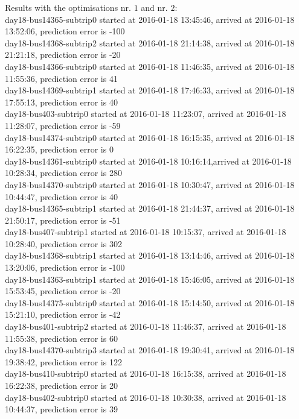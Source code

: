 \documentclass[12pt,a4paper,oneside,openright]{report}
\begin{document}
Results with the optimisations nr. $1$ and nr. $2$: \\
{\footnotesize
day18-bus14365-subtrip0 started at 2016-01-18 13:45:46, arrived at 2016-01-18 13:52:06, prediction error is -100 \\
day18-bus14368-subtrip2 started at 2016-01-18 21:14:38, arrived at 2016-01-18 21:21:18, prediction error is -20 \\
day18-bus14366-subtrip0 started at 2016-01-18 11:46:35, arrived at 2016-01-18 11:55:36, prediction error is 41 \\
day18-bus14369-subtrip1 started at 2016-01-18 17:46:33, arrived at 2016-01-18 17:55:13, prediction error is 40 \\
day18-bus403-subtrip0 started at 2016-01-18 11:23:07,    arrived at 2016-01-18 11:28:07, prediction error is -59 \\
day18-bus14374-subtrip0 started at 2016-01-18 16:15:35, arrived at 2016-01-18 16:22:35, prediction error is 0 \\
day18-bus14361-subtrip0 started at 2016-01-18 10:16:14,arrived at 2016-01-18 10:28:34, prediction error is 280 \\
day18-bus14370-subtrip0 started at 2016-01-18 10:30:47, arrived at 2016-01-18 10:44:47, prediction error is 40 \\
day18-bus14365-subtrip1 started at 2016-01-18 21:44:37, arrived at 2016-01-18 21:50:17, prediction error is -51 \\
day18-bus407-subtrip1 started at 2016-01-18 10:15:37,    arrived at 2016-01-18 10:28:40, prediction error is 302 \\
day18-bus14368-subtrip1 started at 2016-01-18 13:14:46, arrived at 2016-01-18 13:20:06, prediction error is -100 \\
day18-bus14363-subtrip1 started at 2016-01-18 15:46:05, arrived at 2016-01-18 15:53:45, prediction error is -20 \\
day18-bus14375-subtrip0 started at 2016-01-18 15:14:50, arrived at 2016-01-18 15:21:10, prediction error is -42 \\
day18-bus401-subtrip2 started at 2016-01-18 11:46:37,    arrived at 2016-01-18 11:55:38, prediction error is 60 \\
day18-bus14370-subtrip3 started at 2016-01-18 19:30:41, arrived at 2016-01-18 19:38:42, prediction error is 122 \\
day18-bus410-subtrip0 started at 2016-01-18 16:15:38,    arrived at 2016-01-18 16:22:38, prediction error is 20 \\
day18-bus402-subtrip0 started at 2016-01-18 10:30:38,    arrived at 2016-01-18 10:44:37, prediction error is 39 \\
}
\end{document}
